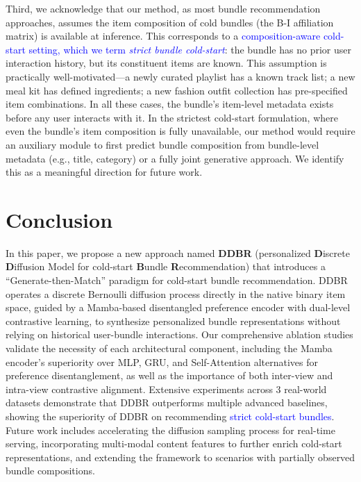 \documentclass[lettersize,journal]{IEEEtran}
\newcommand{\revise}[1]{\textcolor{blue}{#1}}
\begin{document}
Third, we acknowledge that our method, as most bundle recommendation approaches, assumes the item composition of cold bundles (the B-I affiliation matrix) is available at inference. This corresponds to a \revise{composition-aware cold-start setting, which we term \emph{strict bundle cold-start}}: the bundle has no prior user interaction history, but its constituent items are known. This assumption is practically well-motivated---a newly curated playlist has a known track list; a new meal kit has defined ingredients; a new fashion outfit collection has pre-specified item combinations. In all these cases, the bundle's item-level metadata exists before any user interacts with it. In the strictest cold-start formulation, where even the bundle's item composition is fully unavailable, our method would require an auxiliary module to first predict bundle composition from bundle-level metadata (e.g., title, category) or a fully joint generative approach. We identify this as a meaningful direction for future work.

\section{Conclusion}
In this paper, we propose a new approach named \textbf{DDBR} (personalized \textbf{D}iscrete \textbf{D}iffusion Model for cold-start \textbf{B}undle \textbf{R}ecommendation) that introduces a ``Generate-then-Match'' paradigm for cold-start bundle recommendation. DDBR operates a discrete Bernoulli diffusion process directly in the native binary item space, guided by a Mamba-based disentangled preference encoder with dual-level contrastive learning, to synthesize personalized bundle representations without relying on historical user-bundle interactions. Our comprehensive ablation studies validate the necessity of each architectural component, including the Mamba encoder's superiority over MLP, GRU, and Self-Attention alternatives for preference disentanglement, as well as the importance of both inter-view and intra-view contrastive alignment. Extensive experiments across 3 real-world datasets demonstrate that DDBR outperforms multiple advanced baselines, showing the superiority of DDBR on recommending \revise{strict cold-start bundles}. Future work includes accelerating the diffusion sampling process for real-time serving, incorporating multi-modal content features to further enrich cold-start representations, and extending the framework to scenarios with partially observed bundle compositions.




\end{document}
